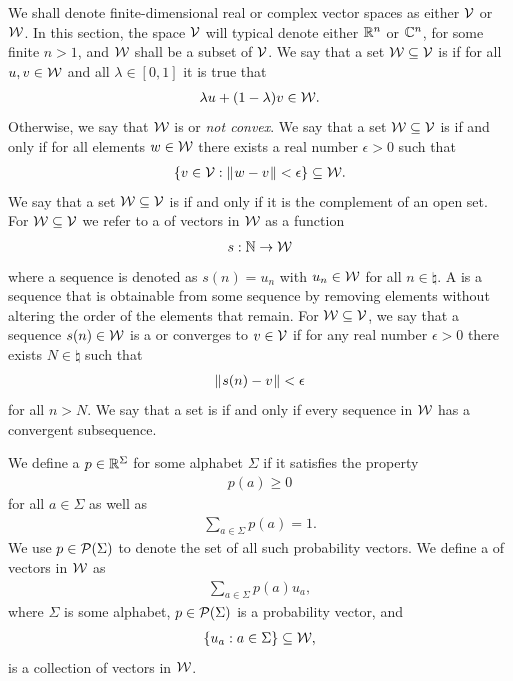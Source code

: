 We shall denote finite-dimensional real or complex vector spaces as either $\V$ or $\W$. In this section, the space $\V$ will typical denote either $\real^n$ or $\complex^n$, for some finite $n > 1$, and $\W$ shall be a subset of $\V$. We say that a set $\W \subseteq \V$ is  if for all $u,v \in \W$ and all $\lambda \in [0,1]$ it is true that 
\begin{align}
	\lambda u + (1-\lambda)v \in \W.
\end{align}
Otherwise, we say that $\W$ is  or \emph{not convex}. We say that a set $\W \subseteq \V$ is  if and only if for all elements $w \in \W$ there exists a real number $\epsilon > 0$ such that 
\begin{align}
	\{ v \in \V : \norm{w-v} < \epsilon \} \subseteq \W.
\end{align}
We say that a set $\W \subseteq \V$ is  if and only if it is the complement of an open set. For $\W \subseteq \V$ we refer to a  of vectors in $\W$ as a function 
\begin{align}
	s: \natural \rightarrow \W
\end{align} 
where a sequence is denoted as $s(n) = u_n$ with $u_n \in \W$ for all $n \in \natural$. A  is a sequence that is obtainable from some sequence by removing elements without altering the order of the elements that remain. For $\W \subseteq \V$, we say that a sequence $s(n) \in \W$ is a  or converges to $v \in \V$ if for any real number $\epsilon > 0$ there exists $N \in \natural$ such that
\begin{align}
	\norm{s(n) - v} < \epsilon
\end{align}
for all $n > N$. We say that a set is  if and only if every sequence in $\W$ has a convergent subsequence.

We define a  $p \in \real^{\Sigma}$ for some alphabet $\Sigma$ if it satisfies the property 
\begin{align}
	p(a) \geq 0
\end{align} 
for all $a \in \Sigma$ as well as 
\begin{align}
	\sum_{a \in \Sigma} p(a) = 1. 
\end{align}
We use $p \in \P(\Sigma)$ to denote the set of all such probability vectors. We define a  of vectors in $\W$ as 
\begin{align}
	\sum_{a \in \Sigma} p(a) u_a,
\end{align}
where $\Sigma$ is some alphabet, $p \in \P(\Sigma)$ is a probability vector, and 
\begin{align}
	\{ u_a : a \in \Sigma \} \subseteq \W,
\end{align}
is a collection of vectors in $\W$. 

